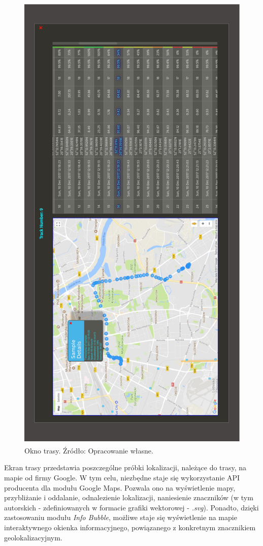 \begin{figure}[H]
	\centering
	\includegraphics[height=23cm, width=16cm]{img/software/website/track_modal.png}
	\caption{Okno trasy. Źródło: Opracowanie własne.}
	\label{fig:image_soft_website_track_map}
\end{figure}

\clearpage
Ekran trasy przedstawia poszczególne próbki lokalizacji, należące do trasy, na mapie od firmy Google. W tym celu, niezbędne staje się wykorzystanie API producenta dla modułu Google Maps. Pozwala ono na wyświetlenie mapy, przybliżanie i oddalanie, odnalezienie lokalizacji, naniesienie znaczników (w tym autorskich - zdefiniowanych w formacie grafiki wektorowej - \textit{.svg}). Ponadto, dzięki zastosowaniu modułu \textit{Info Bubble}, możliwe staje się wyświetlenie na mapie interaktywnego okienka informacyjnego, powiązanego z konkretnym znacznikiem geolokalizacyjnym.

